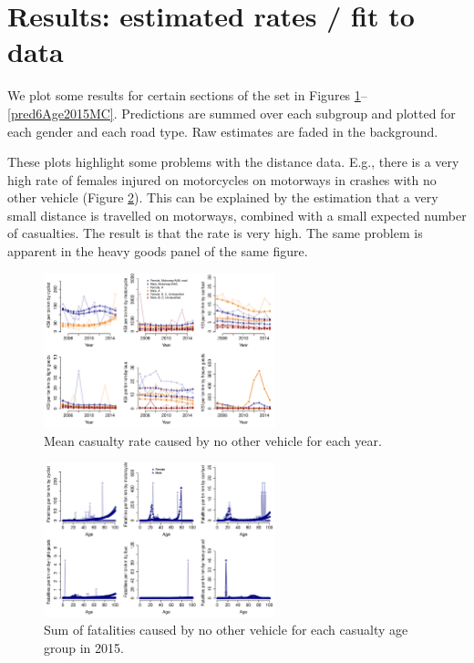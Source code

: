 \documentclass{article}
\begin{document}
\section{Results: estimated rates / fit to data}\label{results}

We plot some results for certain sections of the set in Figures \ref{NOVpredYear}--\ref{pred6Age2015MC}. Predictions are summed over each subgroup and plotted for each gender and each road type. Raw estimates are faded in the background.

These plots highlight some problems with the distance data. E.g., there is a very high rate of females injured on motorcycles on motorways in crashes with no other vehicle (Figure \ref{NOVpredAge2015}). This can be explained by the estimation that a very small distance is travelled on motorways, combined with a small expected number of casualties. The result is that the rate is very high. The same problem is apparent in the heavy goods panel of the same figure.

\begin{figure}[H]
\centering
\includegraphics[width=0.6\textwidth]{NOVpredYearKSI.pdf}
\caption{\small Mean casualty rate caused by no other vehicle for each year.}
\label{NOVpredYear}
\end{figure}

\begin{figure}[H]
\centering
\includegraphics[width=0.6\textwidth]{NOVpredAge2015sumFatalities.pdf}
\caption{\small Sum of fatalities caused by no other vehicle for each casualty age group in 2015.}
\label{NOVpredAge2015}
\end{figure}
\end{document}
